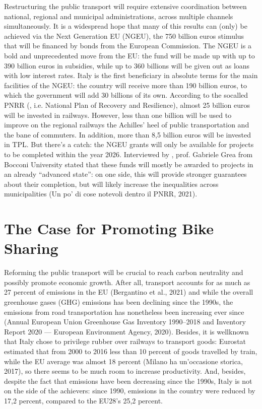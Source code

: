\documentclass[letterpaper,10pt,english]{jupyterBook}
\begin{document}
\sphinxAtStartPar
Restructuring the public transport will require extensive coordination between national, regional and municipal administrations, across multiple channels simultaneously. It is a widespread hope that many of this results can (only) be achieved via the Next Generation EU (NGEU), the 750 billion euros stimulus that will be financed by bonds from the European Commission. The NGEU is a bold and unprecedented move from the EU: the fund will be made up with up to 390 billion euros in subsidies, while up to 360 billions will be given out as loans with low interest rates. Italy is the first beneficiary in absolute terms for the main facilities of the NGEU: the country will receive more than 190 billion euros, to which the government will add 30 billions of its own. According to the so\sphinxhyphen{}called PNRR (, i.e. National Plan of Recovery and Resilience), almost 25 billion euros will be invested in railways. However, less than one billion will be used to improve on the regional railways \sphinxhyphen{} the Achilles’ heel of public transportation and the bane of commuters. In addition, more than 8,5 billion euros will be invested in TPL. But there’s a catch: the NGEU grants will only be available for projects to be completed within the year 2026. Interviewed by , prof. Gabriele Grea from Bocconi University stated that these funds will mostly be awarded to projects in an already “advanced state”: on one side, this will provide stronger guarantees about their completion, but will likely increase the inequalities across municipalities (Un po’ di cose notevoli dentro il PNRR, 2021).


\section{The Case for Promoting Bike Sharing}
\label{\detokenize{01-introduction:the-case-for-promoting-bike-sharing}}
\sphinxAtStartPar
Reforming the public transport will be crucial to reach carbon neutrality and possibly promote economic growth. After all, transport accounts for as much as 27 percent of emissions in the EU (Bergantino et al., 2021) and while the overall greenhouse gases (GHG) emissions has been declining since the 1990s, the emissions from road transportation has nonetheless been increasing ever since (Annual European Union Greenhouse Gas Inventory 1990–2018 and Inventory Report 2020 — European Environment Agency, 2020). Besides, it is well\sphinxhyphen{}known that Italy chose to privilege rubber over railways to transport goods: Eurostat estimated that from 2000 to 2016 less than 10 percent of goods travelled by train, while the EU average was almost 18 percent (Milano ha un’occasione storica, 2017), so there seems to be much room to increase productivity. And, besides, despite the fact that emissions have been decreasing since the 1990s, Italy is not on the side of the achievers: since 1990, emissions in the country were reduced by 17,2 percent, compared to the EU28’s 25,2 percent.
\end{document}
